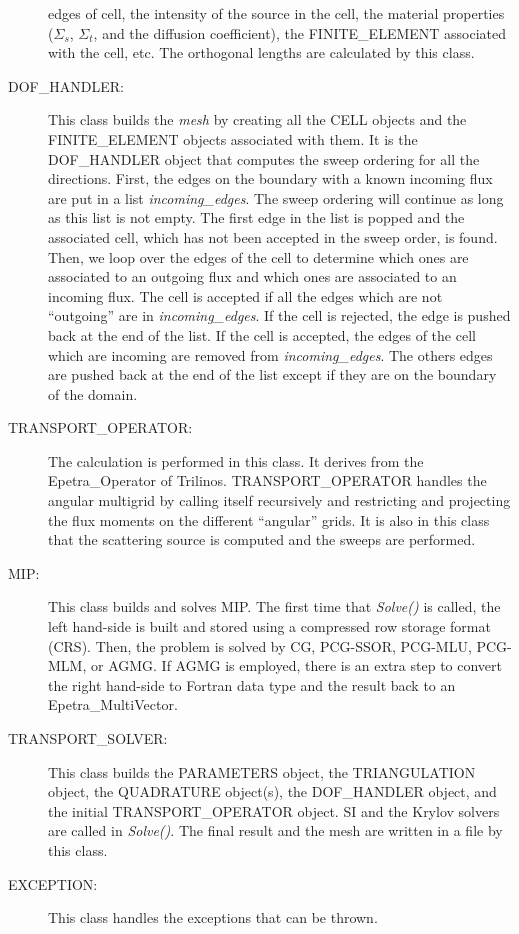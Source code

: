 \begin{description}
    edges of cell, the intensity of the source in the cell, the material
    properties ($\Sigma_s$, $\Sigma_t$, and the diffusion coefficient), 
    the FINITE\_ELEMENT associated with the cell, etc. The orthogonal lengths are
    calculated by this class.
  \item[DOF\_HANDLER:] This class builds the \emph{mesh} by creating all the 
    CELL objects and the  FINITE\_ELEMENT objects associated with them. It is 
    the DOF\_HANDLER object that computes the sweep
    ordering for all the directions. First, the edges on the boundary with a
    known incoming flux are put in a list \emph{incoming\_edges}. The sweep
    ordering will continue as long as this list is not empty. The first edge 
    in the list is popped and the associated cell, which has not been
    accepted in the sweep order, is found. Then, we loop over the edges of 
    the cell to determine which ones are
    associated to an outgoing flux and which ones are associated to an
    incoming flux. The cell is accepted if all the
    edges which are not ``outgoing'' are in \emph{incoming\_edges}. If the cell is
    rejected, the edge is pushed back at the end of the list. If the cell is
    accepted, the edges of the cell which are incoming are removed from
    \emph{incoming\_edges}. The others edges are pushed back at the end of the
    list except if they are on the boundary of the domain.
  \item[TRANSPORT\_OPERATOR:] The calculation is performed in this class. 
    It derives from the Epetra\_Operator of Trilinos.
    TRANSPORT\_OPERATOR handles the angular multigrid by calling itself
    recursively and restricting and projecting the flux moments on the
    different ``angular'' grids. It is also in this class that the scattering 
    source is computed and the sweeps are  performed. 
  \item[MIP:] This class builds and solves MIP. The first time that
    \emph{Solve()} is called, the left hand-side is built and stored using a 
    compressed row storage format (CRS). Then, the problem is
    solved by CG, PCG-SSOR, PCG-MLU, PCG-MLM, or AGMG. If AGMG is employed, 
    there is an extra step to convert the right hand-side to Fortran data type 
    and the result back to an Epetra\_MultiVector.
  \item[TRANSPORT\_SOLVER:] This class builds the PARAMETERS object, the
    TRIANGULATION object, the QUADRATURE object(s), the DOF\_HANDLER object,
    and the initial TRANSPORT\_OPERATOR object. SI and the Krylov solvers are
    called in \emph{Solve()}. The final result and the mesh are written in a file
    by this class.
  \item[EXCEPTION:] This class handles the exceptions that can be thrown.
\end{description}
